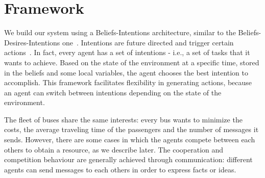 \section{Framework}

We build our system using a Beliefs-Intentions architecture, similar to the Beliefs-Desires-Intentions one~\cite{caillou2017simple}. Intentions are future directed and trigger certain actions~\cite{multiagentsystems}. In fact, every agent has a set of intentions - i.e.,  a set of tasks that it wants to achieve. Based on the state of the environment at a specific time, stored in the beliefs and some local variables, the agent chooses the best intention to accomplish. This framework facilitates flexibility in generating actions, because an agent can switch between intentions depending on the state of the environment.

The fleet of buses share the same interests: every bus wants to minimize the costs, the average traveling time of the passengers and the number of messages it sends. However, there are some cases in which the agents compete between each others to obtain a resource, as we describe later. The cooperation and competition behaviour are generally achieved through communication: different agents can send messages to each others in order to express facts or ideas. 
